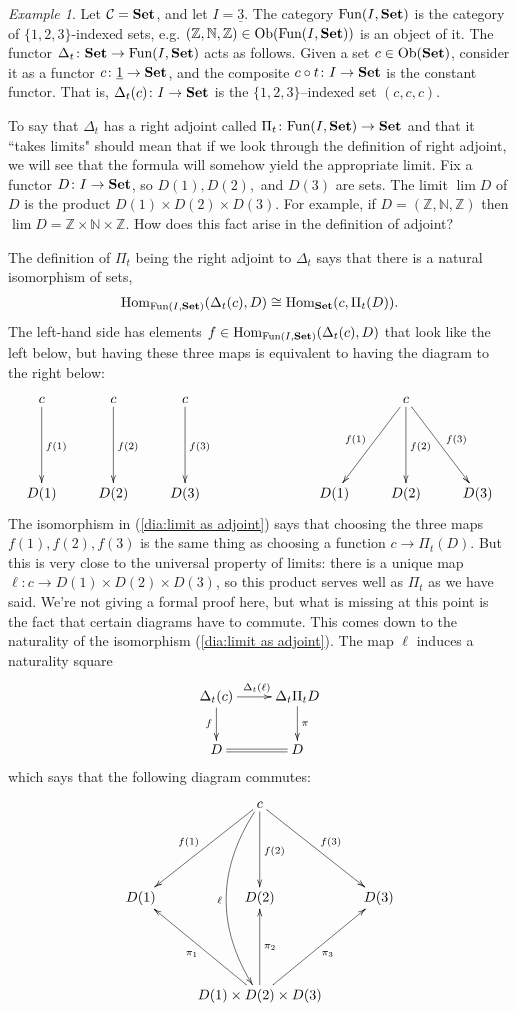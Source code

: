 \documentclass{book}
\def\tn{\textnormal}
\def\mc{\mathcal}
\def\ZZ{{\mathbb Z}}
\def\NN{{\mathbb N}}
\def\Hom{\tn{Hom}}
\def\Fun{\tn{Fun}}
\def\Ob{\tn{Ob}}
\def\to{\rightarrow}
\def\taking{\colon}
\def\iso{\cong}
\def\ul{\underline}
\def\Set{{\bf Set}}
\def\mcC{\mc{C}}
\theoremstyle{remark}
\newtheorem{example}[subsubsection]{Example}
\theoremstyle{definition}
\begin{document}
\begin{example}

Let $\mcC=\Set$, and let $I=\ul{3}$. The category $\Fun(I,\Set)$ is the category of $\{1,2,3\}$-indexed sets, e.g. $(\ZZ,\NN,\ZZ)\in\Ob(\Fun(I,\Set))$ is an object of it. The functor $\Delta_t\taking\Set\to\Fun(I,\Set)$ acts as follows. Given a set $c\in\Ob(\Set)$, consider it as a functor $c\taking\ul{1}\to\Set$, and the composite $c\circ t\taking I\to\Set$ is the constant functor. That is, $\Delta_t(c)\taking I\to\Set$ is the $\{1,2,3\}$--indexed set $(c,c,c)$.

To say that $\Delta_t$ has a right adjoint called $\Pi_t\taking\Fun(I,\Set)\to\Set$ and that it ``takes limits" should mean that if we look through the definition of right adjoint, we will see that the formula will somehow yield the appropriate limit. Fix a functor $D\taking I\to\Set$, so $D(1),D(2),$ and $D(3)$ are sets. The limit $\lim D$ of $D$ is the product $D(1)\times D(2)\times D(3)$. For example, if $D=(\ZZ,\NN,\ZZ)$ then $\lim D=\ZZ\times\NN\times\ZZ$. How does this fact arise in the definition of adjoint?

The definition of $\Pi_t$ being the right adjoint to $\Delta_t$ says that there is a natural isomorphism of sets, 
\begin{align}\label{dia:limit as adjoint}
\Hom_{\Fun(I,\Set)}(\Delta_t(c),D)\iso\Hom_\Set(c,\Pi_t(D)).
\end{align}
The left-hand side has elements $f\in\Hom_{\Fun(I,\Set)}(\Delta_t(c),D)$ that look like the left below, but having these three maps is equivalent to having the diagram to the right below:
$$\xymatrix{
c\ar[dd]^{f(1)}&c\ar[dd]^{f(2)}&c\ar[dd]^{f(3)}\\\\
D(1)&D(2)&D(3)
}
\hspace{1in}
\xymatrix{
&c\ar[ddl]_{f(1)}\ar[dd]^{f(2)}\ar[ddr]^{f(3)}\\\\
D(1)&D(2)&D(3)
}$$
The isomorphism in (\ref{dia:limit as adjoint}) says that choosing the three maps $f(1),f(2),f(3)$ is the same thing as choosing a function $c\to\Pi_t(D)$. But this is very close to the universal property of limits: there is a unique map $\ell\taking c\to D(1)\times D(2)\times D(3)$, so this product serves well as $\Pi_t$ as we have said. We're not giving a formal proof here, but what is missing at this point is the fact that certain diagrams have to commute. This comes down to the naturality of the isomorphism (\ref{dia:limit as adjoint}). The map $\ell$ induces a naturality square
$$\xymatrix{\Delta_t(c)\ar[r]^{\Delta_t(\ell)}\ar[d]_f&\Delta_t\Pi_tD\ar[d]^\pi\\D\ar@{=}[r]&D}$$
which says that the following diagram commutes:
$$\xymatrix{&c\ar[ddl]_{f(1)}\ar[dd]^{f(2)}\ar[ddr]^{f(3)}\ar@/_2pc/[dddd]_\ell\\\\
D(1)&D(2)&D(3)\\\\
&D(1)\times D(2)\times D(3)\ar[uul]^{\pi_1}\ar[uu]_{\pi_2}\ar[uur]_{\pi_3}
}$$

\end{example}
\end{document}
